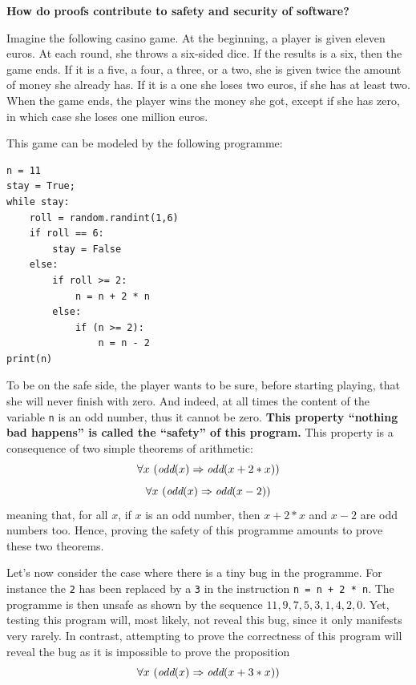 \begin{framed}
\vspace*{-0.5cm}
\begin{center}
{\bf \Large How do proofs contribute to safety and security of software?}
\end{center}

Imagine the following casino game. At the beginning, a player is given
eleven euros. At each round, she throws a six-sided dice. If the
results is a six, then the game ends.  If it is a five, a four, a
three, or a two, she is given twice the amount of money she already
has. If it is a one she loses two euros, if she has at least two.
When the game ends, the player wins the money she got, except if she
has zero, in which case she loses one million euros.

This game can be modeled by the following programme:
\begin{center}
\begin{minipage}{10cm}
\begin{verbatim}
n = 11
stay = True;
while stay:
    roll = random.randint(1,6)
    if roll == 6:
        stay = False
    else:
        if roll >= 2:
            n = n + 2 * n
        else:
            if (n >= 2):
                n = n - 2
print(n)
\end{verbatim}
\end{minipage}
\end{center}

To be on the safe side, the player wants to be sure, before starting
playing, that she will never finish with zero.  And indeed, at all times
the content of the variable {\tt n} is an odd number,
thus it cannot be zero. {\bf This property ``nothing bad happens'' is
called the ``safety'' of this program.} This property is a
consequence of two simple theorems of arithmetic:
$$\forall x~(\mbox{\it odd}(x) \Rightarrow \mbox{\it odd}(x + 2 * x))$$
$$\forall x~(\mbox{\it odd}(x) \Rightarrow \mbox{\it odd}(x - 2))$$
meaning that, for all $x$, if $x$ is an odd number, then $x+2*x$ and $x-2$ are odd numbers too.
Hence, proving the safety of this programme amounts to prove these two
theorems.

Let's now consider the case where there is a tiny bug in the
programme. For instance the {\tt 2} has been replaced by a {\tt 3} in
the instruction {\tt n = n + 2 * n}. The programme is then unsafe as
shown by the sequence $11, 9, 7, 5, 3, 1, 4, 2, 0$. Yet, testing this
program will, most likely, not reveal this bug, since it only
manifests very rarely.  In contrast, attempting to prove the
correctness of this program will reveal the bug as it is impossible to
prove the proposition
$$\forall x~(\mbox{\it odd}(x) \Rightarrow \mbox{\it odd}(x + 3 * x))$$
\end{framed}

